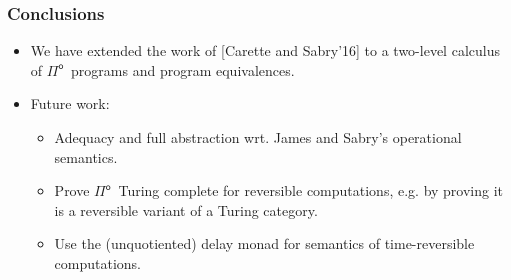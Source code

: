 \documentclass[12pt,t]{beamer}
\newcommand{\Pio}{\ensuremath{\mathsf{\Pi}^{\mathsf{o}}}}
\newcommand{\Set}{\mathsf{Set}}
\begin{document}
\begin{frame}
  \frametitle{Conclusions}
  \begin{itemize}
  \item We have extended the work of [Carette and Sabry'16] to a
    two-level calculus of \Pio\ programs and program equivalences.
    \vspace{\fill}
    \item Future work:
      \begin{itemize}
    \item Adequacy and full abstraction wrt. James and
      Sabry's operational semantics.
    \item Prove \Pio\ Turing complete for reversible computations,
      e.g. by proving it is a reversible variant of a Turing category.
    \item Use the (unquotiented) delay monad for semantics of
      time-reversible computations.
      \end{itemize}
      
      
  \end{itemize}
\end{frame}

\end{document}
